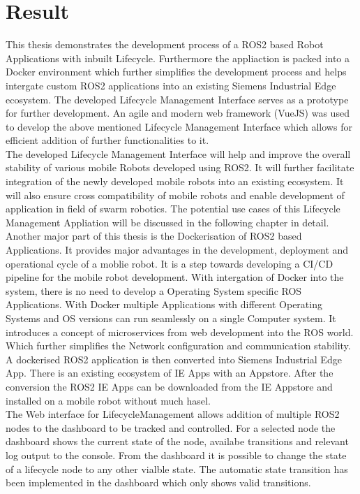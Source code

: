 \chapter{Result}
\label{Result}
	This thesis demonstrates the development process of a ROS2 based Robot Applications with inbuilt Lifecycle. Furthermore the appliaction is packed into a Docker environment which further simplifies the development process and helps intergate custom ROS2 applications into an existing Siemens Industrial Edge ecosystem. The developed Lifecycle Management Interface serves as a prototype for further development. An agile and modern web framework (VueJS) was used to develop the above mentioned Lifecycle Management Interface which allows for efficient addition of further functionalities to it.  
    \\
	
    The developed Lifecycle Management Interface will help and improve the overall stability of various mobile Robots developed using ROS2. It will further facilitate integration of the newly developed mobile robots into an existing ecosystem. It will also ensure cross compatibility of mobile robots and enable development of application in field of swarm robotics. The potential use cases of this Lifecycle Management Appliation will be discussed in the following chapter in detail.
    \\

    Another major part of this thesis is the Dockerisation of ROS2 based Applications. It provides major advantages in the development, deployment and operational cycle of a moblie robot. It is a step towards developing a CI/CD pipeline for the mobile robot development. With intergation of Docker into the system, there is no need to develop a Operating System specific ROS Applications. With Docker multiple Applications with different Operating Systems and OS versions can run seamlessly on a single Computer system. It introduces a concept of microservices from web development into the ROS world. Which further simplifies the Network configuration and communication stability. A dockerised ROS2 application is then converted into Siemens Industrial Edge App. There is an existing ecosystem of IE Apps with an Appstore. After the conversion the ROS2 IE Apps can be downloaded from the IE Appstore and installed on a mobile robot without much hasel. 
    \\
    
    The Web interface for LifecycleManagement allows addition of multiple ROS2 nodes to the dashboard to be tracked and controlled. For a selected node the dashboard shows the current state of the node, availabe transitions and relevant log output to the console. From the dashboard it is possible to change the state of a lifecycle node to any other vialble state. The automatic state transition has been implemented in the dashboard which only shows valid transitions.
